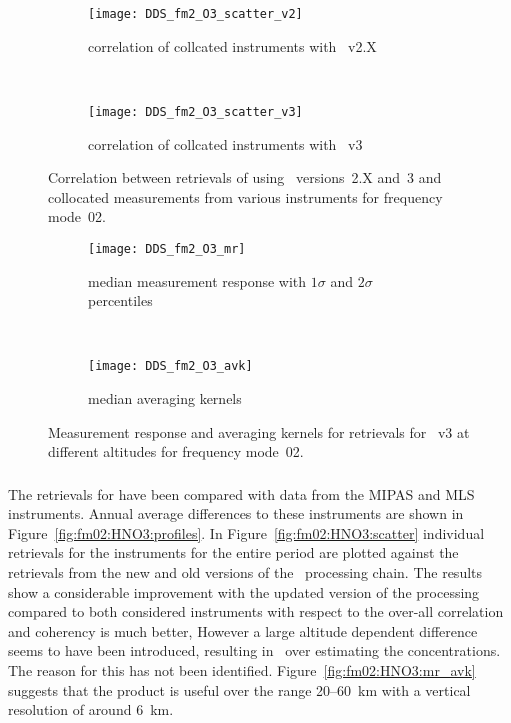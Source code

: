 \begin{figure}[tbhp]
    \centering
    \begin{subfigure}[b]{0.49\textwidth}
        \texttt{[image: DDS\_fm2\_O3\_scatter\_v2]}
        \caption{correlation of collcated instruments with \smr~v2.X}
        \label{fig:fm02:O3:scatter:v2}
    \end{subfigure}
    \,
    \begin{subfigure}[b]{0.49\textwidth}
        \texttt{[image: DDS\_fm2\_O3\_scatter\_v3]}
        \caption{correlation of collcated instruments with \smr~v3}
        \label{fig:fm02:O3:scatter:v3}
    \end{subfigure}
    \caption{Correlation between retrievals of  using \smr\
    versions~2.X and~3 and collocated measurements from various instruments
    for frequency mode~02.}
    \label{fig:fm02:O3:scatter}
\end{figure}

\begin{figure}[tbhp]
    \centering
    \begin{subfigure}[b]{0.49\textwidth}
        \texttt{[image: DDS\_fm2\_O3\_mr]}
        \caption{median measurement response with $1\sigma$ and $2\sigma$
        percentiles}
        \label{fig:fm02:O3:mr}
    \end{subfigure}
    \,
    \begin{subfigure}[b]{0.49\textwidth}
        \texttt{[image: DDS\_fm2\_O3\_avk]}
        \caption{median averaging kernels\newline~}
        \label{fig:fm02:O3:avk}
    \end{subfigure}
    \caption{Measurement response and averaging kernels for 
    retrievals for \smr~v3 at different altitudes for frequency mode~02.}
    \label{fig:fm02:O3:mr_avk}
\end{figure}



\subsubsection{}
\label{sec:fm02:comparison:HNO3} The retrievals for  have been
compared with data from the MIPAS and MLS instruments. Annual average
differences to these instruments are shown in
Figure~\ref{fig:fm02:HNO3:profiles}. In Figure~\ref{fig:fm02:HNO3:scatter}
individual retrievals for the instruments for the entire period are plotted
against the retrievals from the new and old versions of the \smr\ processing
chain. The results show a considerable improvement with the updated version of
the processing compared to both considered instruments with respect to the
over-all correlation and coherency is much better, However a large altitude
dependent difference seems to have been introduced, resulting in \smr\ over
estimating the concentrations. The reason for this has not been identified.
Figure~\ref{fig:fm02:HNO3:mr_avk} suggests that the product is useful over the
range 20--60~km with a vertical resolution of around 6~km.


